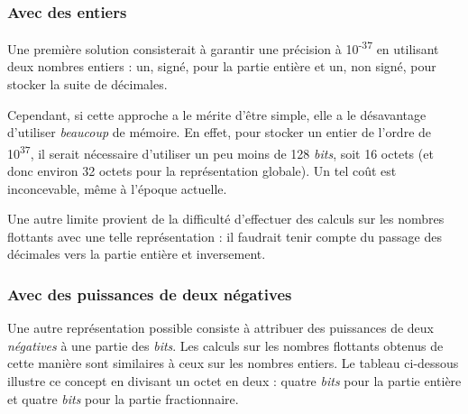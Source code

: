 \subsubsection{Avec des entiers}
\label{avec-des-entiers}

Une première solution consisterait à garantir une précision à
10\textsuperscript{-37} en utilisant deux nombres entiers : un, signé,
pour la partie entière et un, non signé, pour stocker la suite de
décimales.

Cependant, si cette approche a le mérite d'être simple, elle a le
désavantage d'utiliser \emph{beaucoup} de mémoire. En effet, pour
stocker un entier de l'ordre de 10\textsuperscript{37}, il serait
nécessaire d'utiliser un peu moins de 128 \emph{bits}, soit 16 octets
(et donc environ 32 octets pour la représentation globale). Un tel coût
est inconcevable, même à l'époque actuelle.

Une autre limite provient de la difficulté d'effectuer des calculs sur
les nombres flottants avec une telle représentation : il faudrait tenir
compte du passage des décimales vers la partie entière et inversement.

\subsubsection{Avec des puissances de deux négatives}
\label{avec-des-puissances-de-deux-negatives}

Une autre représentation possible consiste à attribuer des puissances de
deux \emph{négatives} à une partie des \emph{bits}. Les calculs sur les
nombres flottants obtenus de cette manière sont similaires à ceux sur
les nombres entiers. Le tableau ci-dessous illustre ce concept en
divisant un octet en deux : quatre \emph{bits} pour la partie entière et
quatre \emph{bits} pour la partie fractionnaire.

